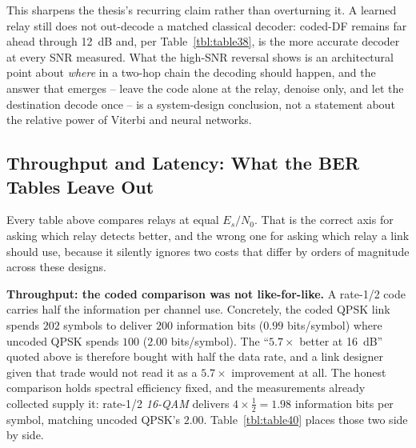 This sharpens the thesis's recurring claim rather than overturning it. A learned relay still does not out-decode a matched classical decoder: coded-DF remains far ahead through 12~dB and, per Table~\ref{tbl:table38}, is the more accurate decoder at every SNR measured. What the high-SNR reversal shows is an architectural point about \emph{where} in a two-hop chain the decoding should happen, and the answer that emerges -- leave the code alone at the relay, denoise only, and let the destination decode once -- is a system-design conclusion, not a statement about the relative power of Viterbi and neural networks.

\subsection{Throughput and Latency: What the BER Tables Leave Out}\label{sec:coded-latency-throughput}

Every table above compares relays at equal $E_s/N_0$. That is the correct axis for asking which relay detects better, and the wrong one for asking which relay a link should use, because it silently ignores two costs that differ by orders of magnitude across these designs.

\textbf{Throughput: the coded comparison was not like-for-like.} A rate-1/2 code carries half the information per channel use. Concretely, the coded QPSK link spends $202$ symbols to deliver $200$ information bits ($0.99$ bits/symbol) where uncoded QPSK spends $100$ ($2.00$ bits/symbol). The ``$5.7\times$ better at 16~dB'' quoted above is therefore bought with half the data rate, and a link designer given that trade would not read it as a $5.7\times$ improvement at all. The honest comparison holds spectral efficiency fixed, and the measurements already collected supply it: rate-1/2 \emph{16-QAM} delivers $4 \times \tfrac12 = 1.98$ information bits per symbol, matching uncoded QPSK's $2.00$. Table~\ref{tbl:table40} places those two side by side.

